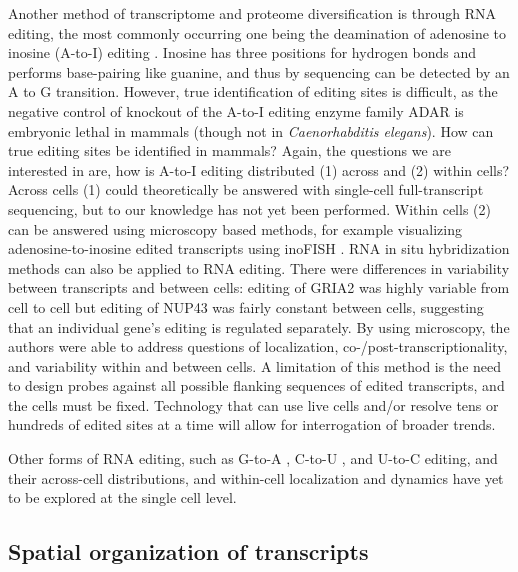 Another method of transcriptome and proteome diversification is through RNA editing, the most commonly occurring one being the deamination of adenosine to inosine (A-to-I) editing \cite{Gott2000-gr,Nishikura2010-dk}. Inosine has three positions for hydrogen bonds and performs base-pairing like guanine, and thus by sequencing can be detected by an A to G transition. However, true identification of editing sites is difficult, as the negative control of knockout of the A-to-I editing enzyme family ADAR is embryonic lethal in mammals (though not in \emph{Caenorhabditis elegans}). How can true editing sites be identified in mammals? Again, the questions we are interested in are, how is A-to-I editing distributed (1) across and (2) within cells? Across cells (1) could theoretically be answered with single-cell full-transcript sequencing, but to our knowledge has not yet been performed. Within cells (2) can be answered using microscopy based methods, for example visualizing adenosine-to-inosine edited transcripts using inoFISH \cite{Mellis2016-nx}. RNA in situ hybridization methods can also be applied to RNA editing. There were differences in variability between transcripts and between cells: editing of GRIA2 was highly variable from cell to cell but editing of NUP43 was fairly constant between cells, suggesting that an individual gene's editing is regulated separately. By using microscopy, the authors were able to address questions of localization, co-/post-transcriptionality, and variability within and between cells. A limitation of this method is the need to design probes against all possible flanking sequences of edited transcripts, and the cells must be fixed. Technology that can use live cells and/or resolve tens or hundreds of edited sites at a time will allow for interrogation of broader trends.

Other forms of RNA editing, such as G-to-A \cite{Niavarani2015-es}, C-to-U \cite{Blanc2003-wk}, and U-to-C \cite{Knie2016-km} editing, and their across-cell distributions, and within-cell localization and dynamics have yet to be explored at the single cell level.

\subsection{Spatial organization of transcripts}

